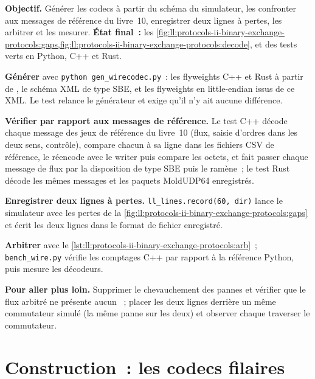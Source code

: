 \begin{tutorial}
\textbf{Objectif.} Générer les codecs à partir du schéma du simulateur, les confronter aux messages de référence du livre~10, enregistrer deux lignes à
pertes, les arbitrer et les mesurer. \textbf{État final~:}
les \cref{fig:ll:protocols-ii-binary-exchange-protocols:gaps,fig:ll:protocols-ii-binary-exchange-protocols:decode}, et
des tests verts en Python, C++ et Rust.
\begin{tutsteps}
\item \textbf{Générer} avec \texttt{python gen\_wirecodec.py}~: les flyweights C++ et Rust à partir de
, le schéma XML de type SBE, et les flyweights en little-endian issus de ce XML. Le test relance
le générateur et exige qu'il n'y ait aucune différence.
\item \textbf{Vérifier par rapport aux messages de référence.} Le test C++ décode chaque message des jeux de référence du livre~10 (flux,
saisie d'ordres dans les deux sens, contrôle), compare chacun à sa ligne dans les fichiers CSV de référence, le réencode avec le writer
puis compare les octets, et fait passer chaque message de flux par la disposition de type SBE puis le ramène~; le test Rust décode les mêmes
messages et les paquets MoldUDP64 enregistrés.
\item \textbf{Enregistrer deux lignes à pertes.} \texttt{ll\_lines.record(60, dir)} lance le simulateur avec les pertes de la
\cref{fig:ll:protocols-ii-binary-exchange-protocols:gaps} et écrit les deux lignes dans le format de fichier enregistré.
\item \textbf{Arbitrer} avec le \cref{lst:ll:protocols-ii-binary-exchange-protocols:arb}~; \texttt{bench\_wire.py} vérifie les comptages C++
par rapport à la référence Python, puis mesure les décodeurs.
\end{tutsteps}
\textbf{Pour aller plus loin.} Supprimer le chevauchement des pannes et vérifier que le flux arbitré ne présente aucun ~; placer les deux lignes
derrière un même commutateur simulé (la même panne sur les deux) et observer chaque  traverser le commutateur.
\end{tutorial}

\section{Construction~: les codecs filaires}\label{bld:ll:protocols-ii-binary-exchange-protocols:wirecodec}

